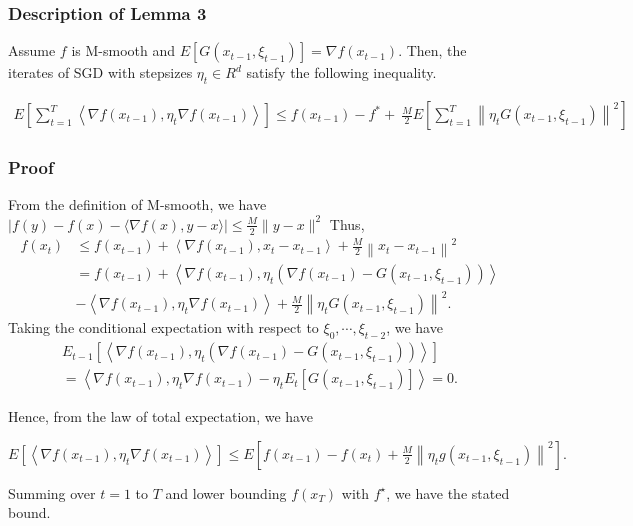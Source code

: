 \documentclass[14pt,onecolumn,letterpaper]{extarticle}
\begin{document}
\subsubsection{Description of Lemma 3}
Assume $f$ is M-smooth and $E[G(x_{t-1},\xi_{t-1})]=\nabla f(x_{t-1})$. 
Then, the iterates of SGD with stepsizes $\eta_t \in R^{d}$ satisfy the following inequality. \par\vspace{3mm}
$\begin{aligned} E\left[\sum_{t=1}^T\left\langle\nabla f\left(x_{t-1}\right), \eta_t \nabla f\left(x_{t-1}\right)\right\rangle\right] \leq f\left(x_{t-1}\right)-f^*  +\ \frac{M}{2} E\left[\sum_{t=1}^T\left\|\eta_t G\left(x_{t-1}, \xi_{t-1}\right)\right\|^2\right]\end{aligned}$
\subsubsection{Proof}
From the definition of M-smooth, we have
$|f(y)-f(x)-\langle\nabla f(x), y-x\rangle| \leq \frac{M}{2}\|y-x\|^2$
Thus,
$$
\begin{aligned}
f\left(x_{t}\right) & \leq f\left(x_{t-1}\right)+\left\langle\nabla f\left(x_{t-1}\right), {x}_{t}-{x}_{t-1}\right\rangle+\frac{M}{2}\left\|{x}_{t}-{x}_{t-1}\right\|^2 \\
& =f\left({x}_{t-1}\right)+\left\langle\nabla f\left({x}_{t-1}\right), {\eta}_t\left(\nabla f\left({x}_{t-1}\right)-{G}\left({x}_{t-1}, \xi_{t-1}\right)\right)\right\rangle \\ &-\left\langle\nabla f\left({x}_{t-1}\right), {\eta}_t \nabla f\left({x}_{t-1}\right)\right\rangle+\frac{M}{2}\left\|{\eta}_t {G}\left({x}_{t-1}, \xi_{t-1}\right)\right\|^2 .
\end{aligned}
$$
Taking the conditional expectation with respect to $\xi_0, \cdots, \xi_{t-2}$, we have\\
\begin{align*}
E_{t-1}\left[\left\langle\nabla f\left({x}_{t-1}\right), {\eta}_t\left(\nabla f\left({x}_{t-1}\right)-{G}\left({x}_{t-1}, \xi_{t-1}\right)\right)\right\rangle\right]\\
=\left\langle\nabla f\left({x}_{t-1}\right), {\eta}_t \nabla f\left({x}_{t-1}\right)-{\eta}_t {E}_t\left[{G}\left({x}_{t-1}, \xi_{t-1}\right)\right]\right\rangle=0 .
\end{align*}
\par\vspace{2mm}
Hence, from the law of total expectation, we have\par\vspace{3mm}
$
{E}\left[\left\langle\nabla f\left({x}_{t-1}\right), {\eta}_t \nabla f\left({x}_{t-1}\right)\right\rangle\right] \leq {E}\left[f\left({x}_{t-1}\right)-f\left({x}_{t}\right)+\frac{M}{2}\left\|{\eta}_t {g}\left({x}_{t-1}, \xi_{t-1}\right)\right\|^2\right] .
$\par\vspace{3mm}
Summing over $t=1$ to $T$ and lower bounding $f\left({x}_{T}\right)$ with $f^{\star}$, we have the stated bound.
\end{document}

